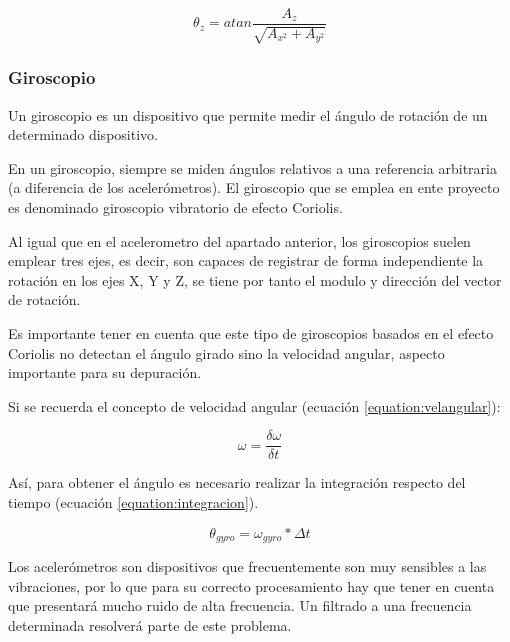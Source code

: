 \begin{equation}
\theta_{z} = atan\frac{A_{z}}{\sqrt{A_{x^2}+A_{y^2}}}
\end{equation}

\subsubsection{Giroscopio}
Un giroscopio es un dispositivo que permite medir el ángulo de rotación de un determinado dispositivo. \newline

En un giroscopio, siempre se miden ángulos relativos a una referencia arbitraria (a diferencia de los acelerómetros). El giroscopio que se emplea en ente proyecto es denominado giroscopio vibratorio de efecto Coriolis. \newline

Al igual que en el acelerometro del apartado anterior, los giroscopios suelen emplear tres ejes, es decir, son capaces de registrar de forma independiente la rotación en los ejes X, Y y Z, se tiene por tanto el modulo y dirección del vector de rotación. \newline

Es importante tener en cuenta que este tipo de giroscopios basados en el efecto Coriolis no detectan el ángulo girado sino la velocidad angular, aspecto importante para su depuración. \newline

Si se recuerda el concepto de velocidad angular (ecuación \ref{equation:velangular}):

\begin{equation} \label{equation:velangular}
\omega = \frac{\delta \omega}{\delta t}
\end{equation}

Así, para obtener el ángulo es necesario realizar la integración respecto del tiempo (ecuación \ref{equation:integracion}).

\begin{equation}\label{equation:integracion}
\theta_{gyro} = \omega_{gyro}*\Delta t
\end{equation}

Los acelerómetros son dispositivos que frecuentemente son muy sensibles a las vibraciones, por lo que para su correcto procesamiento hay que tener en cuenta que presentará mucho ruido de alta frecuencia. Un filtrado a una frecuencia determinada resolverá parte de este problema.\newline

